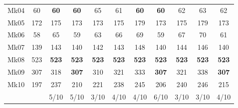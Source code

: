 \begin{table}[t]
\begin{tabular}{|rrccccccccc|}
    \multicolumn{1}{|c|}{Mk04} & \multicolumn{1}{c|}{60} & \multicolumn{1}{c|}{\textbf{60}} & \multicolumn{1}{c|}{\textbf{60}} & \multicolumn{1}{c|}{65} & \multicolumn{1}{c|}{61} & \multicolumn{1}{c|}{\textbf{60}} & \multicolumn{1}{c|}{\textbf{60}} & \multicolumn{1}{c|}{62} & \multicolumn{1}{c|}{63} & 62 \bigstrut\\
    \multicolumn{1}{|c|}{Mk05} & \multicolumn{1}{c|}{172} & \multicolumn{1}{c|}{175} & \multicolumn{1}{c|}{173} & \multicolumn{1}{c|}{173} & \multicolumn{1}{c|}{175} & \multicolumn{1}{c|}{179} & \multicolumn{1}{c|}{173} & \multicolumn{1}{c|}{175} & \multicolumn{1}{c|}{179} & 173 \bigstrut\\
    \multicolumn{1}{|c|}{Mk06} & \multicolumn{1}{c|}{58} & \multicolumn{1}{c|}{65} & \multicolumn{1}{c|}{59} & \multicolumn{1}{c|}{63} & \multicolumn{1}{c|}{66} & \multicolumn{1}{c|}{69} & \multicolumn{1}{c|}{59} & \multicolumn{1}{c|}{67} & \multicolumn{1}{c|}{70} & 61 \bigstrut\\
    \multicolumn{1}{|c|}{Mk07} & \multicolumn{1}{c|}{139} & \multicolumn{1}{c|}{143} & \multicolumn{1}{c|}{140} & \multicolumn{1}{c|}{142} & \multicolumn{1}{c|}{143} & \multicolumn{1}{c|}{148} & \multicolumn{1}{c|}{140} & \multicolumn{1}{c|}{144} & \multicolumn{1}{c|}{146} & 140 \bigstrut\\
    \multicolumn{1}{|c|}{Mk08} & \multicolumn{1}{c|}{523} & \multicolumn{1}{c|}{\textbf{523}} & \multicolumn{1}{c|}{\textbf{523}} & \multicolumn{1}{c|}{\textbf{523}} & \multicolumn{1}{c|}{\textbf{523}} & \multicolumn{1}{c|}{\textbf{523}} & \multicolumn{1}{c|}{\textbf{523}} & \multicolumn{1}{c|}{\textbf{523}} & \multicolumn{1}{c|}{\textbf{523}} & \textbf{523} \bigstrut\\
    \multicolumn{1}{|c|}{Mk09} & \multicolumn{1}{c|}{307} & \multicolumn{1}{c|}{318} & \multicolumn{1}{c|}{\textbf{307}} & \multicolumn{1}{c|}{310} & \multicolumn{1}{c|}{321} & \multicolumn{1}{c|}{333} & \multicolumn{1}{c|}{\textbf{307}} & \multicolumn{1}{c|}{321} & \multicolumn{1}{c|}{338} & \textbf{307} \bigstrut\\
    \multicolumn{1}{|c|}{Mk10} & \multicolumn{1}{c|}{197} & \multicolumn{1}{c|}{237} & \multicolumn{1}{c|}{210} & \multicolumn{1}{c|}{221} & \multicolumn{1}{c|}{238} & \multicolumn{1}{c|}{245} & \multicolumn{1}{c|}{206} & \multicolumn{1}{c|}{240} & \multicolumn{1}{c|}{246} & 215 \bigstrut\\
    \hline
        &     & 5/10 & 5/10 & 3/10 & 4/10 & 4/10 & 6/10 & 3/10 & 3/10 & 4/10 \bigstrut\\
    \hline
    \end{tabular}%
\label{tab:resultadosDE}
\end{table}%

